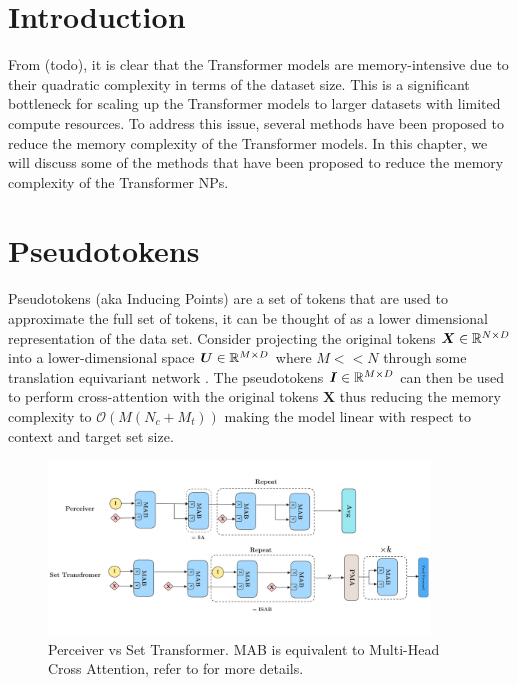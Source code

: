 \documentclass[../../main.tex]{subfiles}
\begin{document}
\section{Introduction}


From (todo), it is clear that the Transformer models are memory-intensive due to their quadratic complexity in terms of the dataset size. This is a significant bottleneck for scaling up the Transformer models to larger datasets with limited compute resources. To address this issue, several methods have been proposed to reduce the memory complexity of the Transformer models. In this chapter, we will discuss some of the methods that have been proposed to reduce the memory complexity of the Transformer NPs.

\section{Pseudotokens}

Pseudotokens (aka Inducing Points) are a set of tokens that are used to approximate the full set of tokens, it can be thought of as a lower dimensional representation of the data set. Consider projecting the original tokens $\bm{X} \in \mathbb{R}^{N \times D}$ into a lower-dimensional space $\bm{U} \in \mathbb{R}^{M \times D}$ where $M << N$ through some translation equivariant network \parencite{anonymous2024translationequivariant}. The pseudotokens $\bm{I} \in \mathbb{R}^{M \times D}$ can then be used to perform cross-attention with the original tokens $\bm{X}$ thus reducing the memory complexity to $\mathcal{O}(M(N_c + M_t))$ making the model linear with respect to context and target set size.



\begin{figure}[H]
    \centering
    \includegraphics[width=0.9\textwidth]{fig/set-transformer.png}
    \caption{Perceiver vs Set Transformer. MAB is equivalent to Multi-Head Cross Attention, refer to \parencite{anonymous2024translationequivariant} for more details.}
    \label{fig:set-transformer}
\end{figure}
\end{document}
